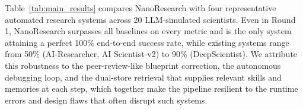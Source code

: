 \documentclass{opendatalab}
\begin{document}

        


 

Table~\ref{tab:main_results} compares NanoResearch with four representative automated research systems across 20 LLM-simulated scientists. Even in Round 1, NanoResearch surpasses all baselines on every metric and is the only system attaining a perfect 100\% end-to-end success rate, while existing systems range from 50\% (AI-Researcher, AI Scientist-v2) to 90\% (DeepScientist). We attribute this robustness to the peer-review-like blueprint correction, the autonomous debugging loop, and the dual-store retrieval that supplies relevant skills and memories at each step, which together make the pipeline resilient to the runtime errors and design flaws that often disrupt such systems.
\end{document}
